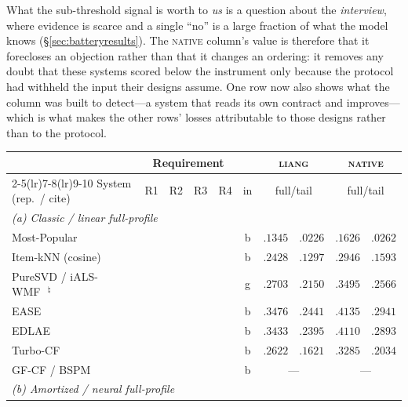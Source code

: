 \documentclass[11pt]{article}
\newcommand{\cmark}{\ding{51}}
\newcommand{\xmark}{\ding{55}}
\begin{document}
What the sub-threshold signal is worth to \emph{us} is a question about the \emph{interview}, where evidence
is scarce and a single ``no'' is a large fraction of what the model knows (\S\ref{sec:batteryresults}). The
\textsc{native} column's value is therefore that it forecloses an objection rather than that it changes an
ordering: it removes any doubt that these systems scored below the instrument only because the protocol
had withheld the input their designs assume. One row now also shows what the column was built to detect---a
system that reads its own contract and improves---which is what makes the other rows' losses attributable
to those designs rather than to the protocol.


\begin{table}[!htbp]\centering\scriptsize
\setlength{\tabcolsep}{3.5pt}
\renewcommand{\arraystretch}{1.05}
\begin{tabular}{p{4.9cm}cccc c r@{\,/\,}l r@{\,/\,}l}
\toprule
 & \multicolumn{4}{c}{Requirement} & &
   \multicolumn{2}{c}{\textsc{liang}} & \multicolumn{2}{c}{\textsc{native}} \\
\cmidrule(lr){2-5}\cmidrule(lr){7-8}\cmidrule(lr){9-10}
System (rep.\ / cite) & R1 & R2 & R3 & R4 & in & \multicolumn{2}{c}{full/tail} &
   \multicolumn{2}{c}{full/tail} \\
\midrule
\multicolumn{10}{l}{\emph{(a) Classic / linear full-profile}}\\
Most-Popular & \xmark & \xmark & \xmark & \xmark & b & $.1345$ & $.0226$ & $.1626$ & $.0262$ \\
Item-kNN (cosine) & \xmark & \xmark & \xmark & \xmark & b & $.2428$ & $.1297$ & $.2946$ & $.1593$ \\
PureSVD / iALS-WMF~\cite{hu2008collaborative}\,$^{\natural}$ & \xmark & \xmark & \xmark & \xmark & g & $.2703$ & $.2150$ & $.3495$ & $.2566$ \\
EASE~\cite{steck2019ease} & \cmark & \xmark & \xmark & \xmark & b & $.3476$ & $.2441$ & $.4135$ & $.2941$ \\
EDLAE~\cite{steck2020edlae} & \cmark & \xmark & \xmark & \xmark & b & $.3433$ & $.2395$ & $.4110$ & $.2893$ \\
Turbo-CF~\cite{park2024turbocf} & \xmark & \xmark & \xmark & \xmark & b & $.2622$ & $.1621$ & $.3285$ & $.2034$ \\
GF-CF / BSPM~\cite{shen2021gfcf,choi2023bspm} & \xmark & \xmark & \xmark & \xmark & b & \multicolumn{2}{c}{---} & \multicolumn{2}{c}{---} \\
\midrule
\multicolumn{10}{l}{\emph{(b) Amortized / neural full-profile}}\\

\end{tabular}
\end{table}
\end{document}
